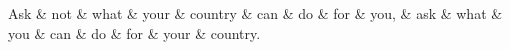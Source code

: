 \begin{dependency}[theme = simple, group style =anderson]
\begin{deptext}[column sep = .5cm]
Ask \& not \& what \& your \& country \& can \& do \& for \& you, \& ask \& what \& you \& can \& do \& for \& your \& country. \\
\end{deptext}
\end{dependency}